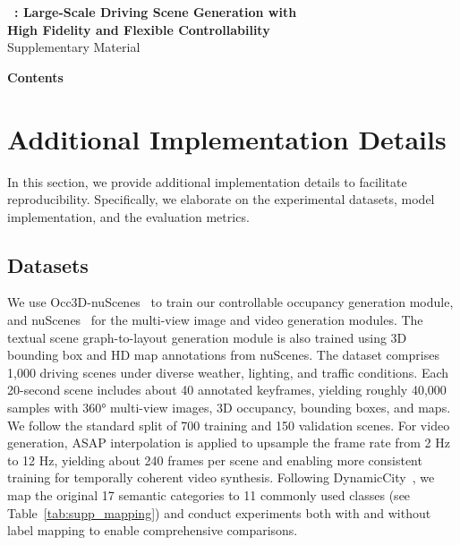 \clearpage
\renewcommand{\thesection}{\Alph{section}}
\setcounter{section}{0}

\begin{center}
    \textbf{\Large ~\ours: Large-Scale Driving Scene Generation with \\[0.4em] High Fidelity and Flexible Controllability}\\[1.2em]
    \large Supplementary Material
\end{center}

\vspace{1.2em}
{\large \textbf{Contents}}

\startcontents[appendices]

\clearpage
\section{Additional Implementation Details}
In this section, we provide additional implementation details to facilitate reproducibility. Specifically, we elaborate on the experimental datasets, model implementation, and the evaluation metrics.


\subsection{Datasets}
We use Occ3D-nuScenes~\cite{Occ3D} to train our controllable occupancy generation module, and nuScenes~\cite{nuScenes} for the multi-view image and video generation modules. The textual scene graph-to-layout generation module is also trained using 3D bounding box and HD map annotations from nuScenes. The dataset comprises 1,000 driving scenes under diverse weather, lighting, and traffic conditions. Each 20-second scene includes about 40 annotated keyframes, yielding roughly 40,000 samples with 360° multi-view images, 3D occupancy, bounding boxes, and maps. We follow the standard split of 700 training and 150 validation scenes. For video generation, ASAP interpolation is applied to upsample the frame rate from 2 Hz to 12 Hz, yielding about 240 frames per scene and enabling more consistent training for temporally coherent video synthesis.
Following DynamicCity~\cite{DynamicCity}, we map the original 17 semantic categories to 11 commonly used classes (see Table~\ref{tab:supp_mapping}) and conduct experiments both with and without label mapping to enable comprehensive comparisons.



